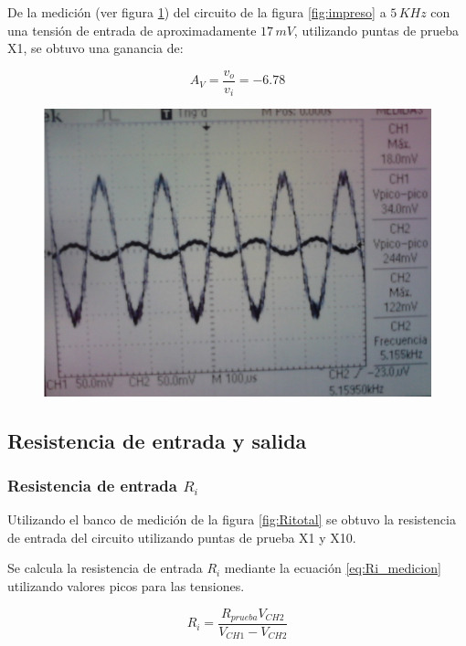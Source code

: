 \documentclass[10pt,spanish,a4paper,notitlepage]{article}
\begin{document}
De la medición (ver figura \ref{fig:medicion_Avmedias}) del circuito de la figura \ref{fig:impreso} a $5\,\unit{KHz}$ con una tensión de entrada de aproximadamente $17\,\unit{mV}$, utilizando puntas de prueba X1, se obtuvo una ganancia de:

\[ \displaystyle A_{V} = \frac{v_o}{v_i} = -6.78 \]

\begin{figure}[H]
\centering
\includegraphics[scale=0.12]{mediciones/Av_medias_puntaX1_5kHz.jpg}
\caption{}
\label{fig:medicion_Avmedias}
\end{figure}


\subsection{Resistencia de entrada y salida}

\subsubsection{Resistencia de entrada \texorpdfstring{$R_i$}{TEXT}}

Utilizando el banco de medición de la figura \ref{fig:Ritotal} se
obtuvo la resistencia de entrada del circuito utilizando puntas
de prueba X1 y X10.

Se calcula la resistencia de entrada $R_i$ mediante la ecuación \ref{eq:Ri_medicion} utilizando valores picos para las tensiones.

\begin{equation}
    R_i = \frac{R_{prueba} V_{CH2}}{V_{CH1} - V_{CH2}}
   \label{eq:Ri_medicion}
\end{equation}
\end{document}
